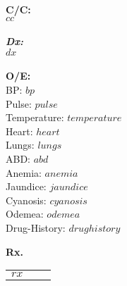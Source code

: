 \documentclass[12pt]{article}
\begin{document}
\setcolumnwidth{2in, 5in}
\vspace*{-0.4cm}
\noindent\textcolor{KUrod}{\makebox[\linewidth]{\rule{\paperwidth}{0.4pt}}}
\vspace*{0.05cm}

\begin{paracol}{2}

    \begin{tcolorbox}[blanker, breakable, width=\linewidth]
    {\fontsize{8}{14}\selectfont

    \textbf{\large C/C:}
    \\
    $ cc $
    \\ \\
    \textbf{\large\em Dx:}
    \\
    $ dx $
    \\ \\
    \textbf{\large O/E:}
    \\
    BP: $ bp $ \\
	Pulse: $ pulse $\\
	Temperature: $ temperature $\\
	Heart: $ heart $\\
	Lungs: $ lungs $\\
	ABD: $ abd $\\
	Anemia: $ anemia $\\
	Jaundice: $ jaundice $\\
	Cyanosis: $ cyanosis $\\
	Odemea: $ odemea $\\
	Drug-History: $ drug history $\\
    }
    \end{tcolorbox}

    \setlength{\columnseprule}{0.4pt}
    \switchcolumn
    \begin{tcolorbox}[blanker, breakable, width=\linewidth]

    {\bf Rx.}
    \\
        \begin{supertabular}[l]{lll}
        \\
        $ rx $
        \end{supertabular}
    \end{tcolorbox}
\end{paracol}
\end{document}
